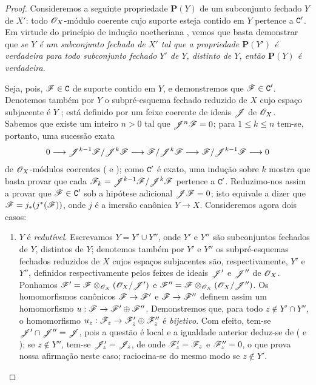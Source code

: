 \begin{proof}
Consideremos a seguinte propriedade $\textbf{P}(Y)$ de um subconjunto fechado $Y$ de $X'$: todo $\mathscr{O}_X$-módulo coerente cujo suporte esteja contido em $Y$ pertence a $\mathtt{C}'$.
Em virtude do princípio de indução noetheriana , vemos que basta demonstrar que \emph{se $Y$ é um subconjunto fechado de $X'$ tal que a propriedade $\textbf{P}(Y')$ é verdadeira para todo subconjunto fechado $Y'$ de $Y$, distinto de $Y$, então $\textbf{P}(Y)$ é verdadeira}.

Seja, pois, $\mathscr{F}\in\mathtt{C}$ de suporte contido em $Y$, e demonstremos que $\mathscr{F}\in\mathtt{C}'$.
Denotemos também por $Y$ o subpré-esquema fechado reduzido de $X$ cujo espaço subjacente é $Y$ ; está definido por um feixe coerente de ideais $\mathscr{J}$ de $\mathscr{O}_X$.
Sabemos  que existe um inteiro $n>0$ tal que $\mathscr{J}^n\mathscr{F}=0$; para $1\leq k\leq n$ tem-se, portanto, uma sucessão exata
\[
  0\to\sh{J}^{k-1}\sh{F}/\sh{J}^k\sh{F}\to\sh{F}/\sh{J}^k\sh{F}\to\sh{F}/\sh{J}^{k-1}\sh{F}\to 0
\]
 de $\mathscr{O}_X$-módulos coerentes ( e ); como $\mathtt{C}'$ é exato, uma indução sobre $k$ mostra que basta provar que cada $\mathscr{F}_k=\mathscr{J}^{k-1}\mathscr{F}/\mathscr{J}^k\mathscr{F}$ pertence a $\mathtt{C}'$.
Reduzimo-nos assim a provar que $\mathscr{F}\in\mathtt{C}'$ sob a hipótese adicional $\mathscr{J}\mathscr{F}=0$; isto equivale a dizer que $\mathscr{F}=j_*(j^*(\mathscr{F}))$, onde $j$ é a imersão canônica $Y\to X$.
Consideremos agora dois casos:
\begin{enumerate}
  \item[(a)] $Y$ é \emph{redutível}.
    Escrevamos $Y=Y'\cup Y''$, onde $Y'$ e $Y''$ são subconjuntos fechados de $Y$, distintos de $Y$; denotemos também por $Y'$ e $Y''$ os subpré-esquemas fechados reduzidos de $X$ cujos espaços subjacentes são, respectivamente, $Y'$ e $Y''$, definidos respectivamente pelos feixes de ideais $\mathscr{J}'$ e $\mathscr{J}''$ de $\mathscr{O}_X$.
    Ponhamos $\mathscr{F}'=\mathscr{F}\otimes_{\mathscr{O}_X}(\mathscr{O}_X/\mathscr{J}')$ e $\mathscr{F}''=\mathscr{F}\otimes_{\mathscr{O}_X}(\mathscr{O}_X/\mathscr{J}'')$.
    Os homomorfismos canônicos $\sh{F}\to\sh{F}'$ e $\sh{F}\to\sh{F}''$ definem assim um homomorfismo $u:\sh{F}\to\sh{F}'\oplus\sh{F}''$.
    Demonstremos que, para todo $z\not\in Y'\cap Y''$, o homomorfismo $u_z:\sh{F}_z\to\sh{F}_z'\oplus\sh{F}_z''$ é \emph{bijetivo}.
    Com efeito, tem-se $\mathscr{J}'\cap\mathscr{J}''=\mathscr{J}$, pois a questão é local e
    a igualdade anterior deduz-se de ( e ); se $z\not\in Y''$, tem-se $\mathscr{J}_z'=\mathscr{J}_z$, de onde $\mathscr{F}_z'=\mathscr{F}_z$ e $\mathscr{F}_z''=0$, o que prova nossa afirmação neste caso; raciocina-se do mesmo modo se $z\not\in Y'$.

\end{enumerate}
\end{proof}
